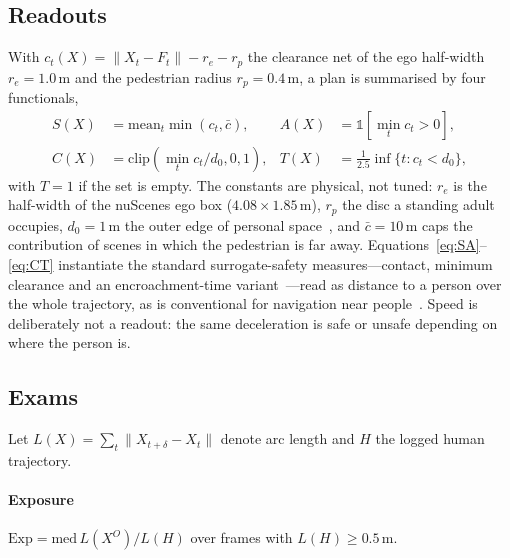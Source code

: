 \subsection{Readouts}
With $c_t(X)=\|X_t-F_t\|-r_e-r_p$ the clearance net of the ego half-width $r_e=1.0$\,m and the
pedestrian radius $r_p=0.4$\,m, a plan is summarised by four functionals,
\begin{align}
S(X)&=\mathrm{mean}_t\min(c_t,\bar c), &
A(X)&=\mathbb{1}[\min_t c_t>0],\label{eq:SA}\\
C(X)&=\mathrm{clip}(\min_t c_t/d_0,0,1), &
T(X)&=\tfrac{1}{2.5}\inf\{t\!:c_t<d_0\},\label{eq:CT}
\end{align}
with $T=1$ if the set is empty. The constants are physical, not tuned: $r_e$ is the half-width of the
nuScenes ego box ($4.08\times1.85$\,m), $r_p$ the disc a standing adult occupies, $d_0=1$\,m the outer
edge of personal space~\cite{hall1966hidden}, and $\bar c=10$\,m caps the contribution of scenes in
which the pedestrian is far away. Equations~\eqref{eq:SA}--\eqref{eq:CT} instantiate the standard
surrogate-safety measures---contact, minimum clearance and an encroachment-time
variant~\cite{gettman2003surrogate,hayward1972near}---read as distance to a person over the whole
trajectory, as is conventional for navigation near people~\cite{kruse2013human}. Speed is deliberately
not a readout: the same deceleration is safe or unsafe depending on where the person is.

\subsection{Exams}
Let $L(X)=\sum_t\|X_{t+\delta}-X_t\|$ denote arc length and $H$ the logged human trajectory.

\paragraph{Exposure}
$\mathrm{Exp}=\mathrm{med}\,L(X^{O})/L(H)$ over frames with $L(H)\ge0.5$\,m.


